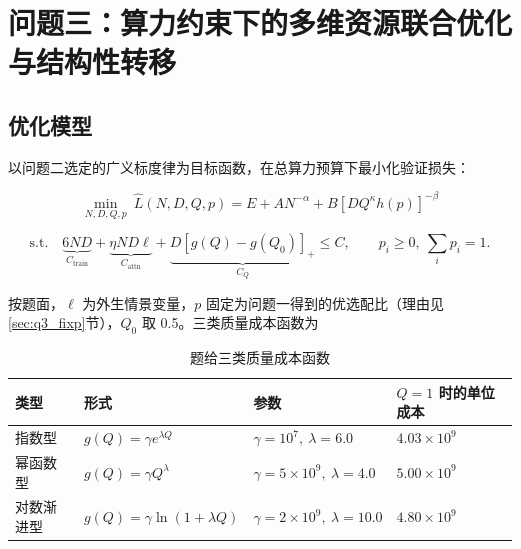 \section{问题三：算力约束下的多维资源联合优化与结构性转移}
\label{sec:q3}


\subsection{优化模型}

以问题二选定的广义标度律为目标函数，在总算力预算下最小化验证损失：

\begin{equation}
\min_{N,D,Q,p}\ \widehat{L}(N,D,Q,p)=E+AN^{-\alpha}+B\left[DQ^{\kappa}h(p)\right]^{-\beta}
\end{equation}

\begin{equation}
\text{s.t.}\quad
\underbrace{6ND}_{C_{\mathrm{train}}}+\underbrace{\eta ND\ell}_{C_{\mathrm{attn}}}+\underbrace{D\left[g(Q)-g(Q_0)\right]_+}_{C_Q}\le C,
\qquad p_i\ge0,\ \sum_i p_i=1 .
\label{eq:q3_con}
\end{equation}

按题面，$\ell$ 为外生情景变量，$p$ 固定为问题一得到的优选配比（理由见\ref{sec:q3_fixp}节），$Q_0$ 取 0.5。三类质量成本函数为

\begin{table}[htbp]
\centering
\caption{题给三类质量成本函数}
\label{tab:q3_cost}
\small
\begin{tabular}{l|l|l|l}
\toprule
\textbf{类型} & \textbf{形式} & \textbf{参数} & \textbf{$Q=1$ 时的单位成本} \\
\midrule
指数型 & $g(Q)=\gamma e^{\lambda Q}$ & $\gamma=10^{7},\ \lambda=6.0$ & $4.03\times10^{9}$ \\
幂函数型 & $g(Q)=\gamma Q^{\lambda}$ & $\gamma=5\times10^{9},\ \lambda=4.0$ & $5.00\times10^{9}$ \\
对数渐进型 & $g(Q)=\gamma\ln(1+\lambda Q)$ & $\gamma=2\times10^{9},\ \lambda=10.0$ & $4.80\times10^{9}$ \\
\bottomrule
\end{tabular}
\end{table}

